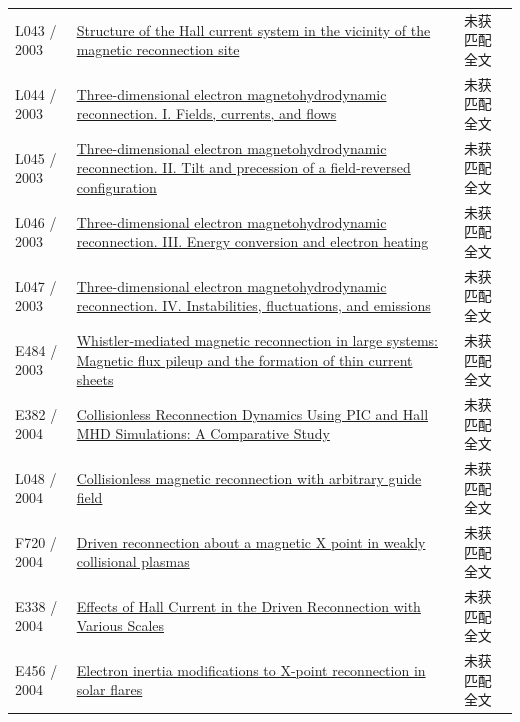 \begin{longtable}{P{24mm}P{97mm}P{27mm}}
L043 / 2003 & \href{https://doi.org/10.1029/2003ja009900}{Structure of the Hall current system in the vicinity of the magnetic reconnection site} & 未获匹配全文\\

L044 / 2003 & \href{https://doi.org/10.1063/1.1578998}{Three-dimensional electron magnetohydrodynamic reconnection. I. Fields,  currents,  and flows} & 未获匹配全文\\

L045 / 2003 & \href{https://doi.org/10.1063/1.1578999}{Three-dimensional electron magnetohydrodynamic reconnection. II. Tilt and precession of a field-reversed configuration} & 未获匹配全文\\

L046 / 2003 & \href{https://doi.org/10.1063/1.1579000}{Three-dimensional electron magnetohydrodynamic reconnection. III. Energy conversion and electron heating} & 未获匹配全文\\

L047 / 2003 & \href{https://doi.org/10.1063/1.1579001}{Three-dimensional electron magnetohydrodynamic reconnection. IV. Instabilities,  fluctuations,  and emissions} & 未获匹配全文\\

E484 / 2003 & \href{https://doi.org/10.1029/2001ja009180}{Whistler‐mediated magnetic reconnection in large systems: Magnetic flux pileup and the formation of thin current sheets} & 未获匹配全文\\

E382 / 2004 & \href{https://ui.adsabs.harvard.edu/abs/2004APS..DPPBP1073B/abstract}{Collisionless Reconnection Dynamics Using PIC and Hall MHD Simulations: A Comparative Study} & 未获匹配全文\\

L048 / 2004 & \href{https://doi.org/10.1063/1.1791640}{Collisionless magnetic reconnection with arbitrary guide field} & 未获匹配全文\\

F720 / 2004 & \href{https://doi.org/10.1063/1.1796691}{Driven reconnection about a magnetic X point in weakly collisional plasmas} & 未获匹配全文\\

E338 / 2004 & \href{https://doi.org/10.1088/0256-307x/21/7/059}{Effects of Hall Current in the Driven Reconnection with Various Scales} & 未获匹配全文\\

E456 / 2004 & \href{http://ui.adsabs.harvard.edu/abs/2004cosp...35.1242M/abstract}{Electron inertia modifications to X-point reconnection in solar flares} & 未获匹配全文\\


\end{longtable}

